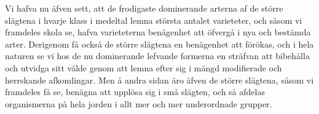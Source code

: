 Vi hafva nu äfven sett, att de frodigaste dominerande arterna af de större slägtena i hvarje klass i medeltal lemna största antalet varieteter, och såsom vi framdeles skola se, hafva varieteterna benägenhet att öfvergå i nya och bestämda arter. Derigenom få också de större slägtena en benägenhet att förökas, och i hela naturen se vi hos de nu dominerande lefvande formerna en sträfvan att bibehålla och utvidga sitt välde genom att lemna efter sig i mängd modifierade och herrskande afkomlingar. Men å andra sidan äro äfven de större slägtena, såsom vi framdeles få se, benägna att upplösa sig i små slägten, och så afdelas organismerna på hela jorden i allt mer och mer underordnade grupper.


